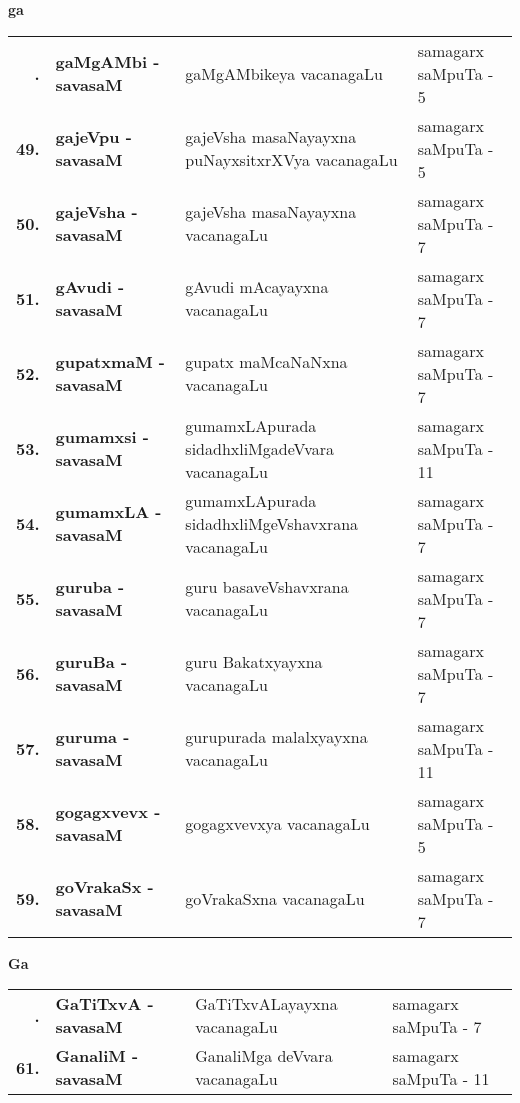 \centerline{\bf ga}
\medskip

{\renewcommand{\arraystretch}{1.3}
\begin{longtable}{>{\bf}r>{\bf}l>{\raggedright}p{8cm}l}
\endfirsthead
\endhead
\endfoot
\endlastfoot
48. &  gaMgAMbi - savasaM & gaMgAMbikeya vacanagaLu & samagarx saMpuTa - 5\\
49. &  gajeVpu - savasaM & gajeVsha masaNayayxna puNayxsitxrXVya vacanagaLu & samagarx saMpuTa - 5 \\
50. &  gajeVsha - savasaM & gajeVsha masaNayayxna vacanagaLu & samagarx saMpuTa - 7 \\
51. &  gAvudi - savasaM &  gAvudi mAcayayxna vacanagaLu & samagarx saMpuTa - 7 \\
52. &  gupatxmaM - savasaM & gupatx maMcaNaNxna vacanagaLu & samagarx saMpuTa - 7 \\
53. &  gumamxsi - savasaM & gumamxLApurada sidadhxliMgadeVvara vacanagaLu & samagarx saMpuTa - 11 \\
54. &  gumamxLA - savasaM & gumamxLApurada sidadhxliMgeVshavxrana vacanagaLu & samagarx saMpuTa - 7 \\
55. &  guruba - savasaM & guru basaveVshavxrana vacanagaLu & samagarx saMpuTa - 7 \\
56. &  guruBa - savasaM & guru Bakatxyayxna vacanagaLu & samagarx saMpuTa - 7 \\
57. &  guruma - savasaM & gurupurada malalxyayxna vacanagaLu & samagarx saMpuTa - 11 \\
58. & gogagxvevx  - savasaM & gogagxvevxya vacanagaLu & samagarx saMpuTa - 5 \\
59. &  goVrakaSx - savasaM & goVrakaSxna vacanagaLu & samagarx saMpuTa - 7
\end{longtable}}
\smallskip

\centerline{\bf Ga}

{\renewcommand{\arraystretch}{1.3}
\begin{longtable}{>{\bf}r>{\bf}l>{\raggedright}p{8cm}l}
\endfirsthead
\endhead
\endfoot
\endlastfoot
60. &  GaTiTxvA - savasaM & GaTiTxvALayayxna vacanagaLu & samagarx saMpuTa - 7\\
61. &  GanaliM - savasaM & GanaliMga deVvara vacanagaLu & samagarx saMpuTa - 11
\end{longtable}}

\smallskip

